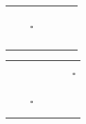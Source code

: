 \documentclass[10pt]{article}
\begin{document}
\begin{center}
\begin{tabular}{|l|l|l|l|l|l|l|}
\hline
 &  &  &  &  &  &  \\
\hline
 &  &  &  &  &  &  \\
\hline
 &  &  &  &  &  &  \\
\hline
 &  &  &  &  &  &  \\
\hline
 &  & \(\square\) &  &  &  &  \\
\hline
 &  &  &  &  &  &  \\
\hline
 &  &  &  &  &  &  \\
\hline
 &  &  &  &  &  &  \\
\hline
 &  &  &  &  &  &  \\
\hline
\end{tabular}
\end{center}

\begin{center}
\begin{tabular}{|l|l|l|l|l|l|l|}
\hline
 &  &  &  &  &  &  \\
\hline
 &  &  &  &  &  &  \\
\hline
 &  &  &  &  &  & \(\square\) \\
\hline
 &  &  &  &  &  &  \\
\hline
 &  &  &  &  &  &  \\
\hline
 &  &  &  &  &  &  \\
\hline
 &  & \(\square\) &  &  &  &  \\
\hline
 &  &  &  &  &  &  \\
\hline
 &  &  &  &  &  &  \\
\hline
\end{tabular}
\end{center}
\end{document}

